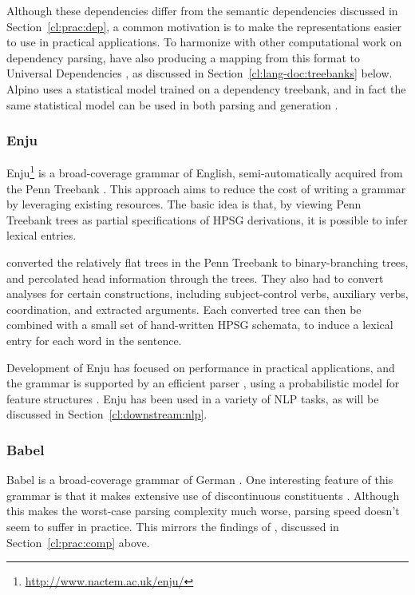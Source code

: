 \documentclass[output=paper,nonflat]{langsci/langscibook}
\begin{document}
Although these dependencies differ from the semantic dependencies discussed in Section~\ref{cl:prac:dep},
a common motivation is to make the representations easier to use in practical applications.
To harmonize with other computational work on dependency parsing,
\citet{Bou:Van:17} have also producing a mapping from this format
to Universal Dependencies \citep[UD;][]{Niv:Mar:Gin:16},
as discussed in Section~\ref{cl:lang-doc:treebanks} below.
Alpino uses a statistical model trained on a dependency treebank,
and in fact the same statistical model can be used in both parsing and generation \citep{dekok2011reversible}.


\subsubsection{Enju}
\label{cl:other:enju}

Enju\footnote{%
	\url{http://www.nactem.ac.uk/enju/}
}
is a broad-coverage grammar of English,
semi-automatically acquired from the Penn Treebank \citep{MNT2005a-u}.
This approach aims to reduce the cost of writing a grammar
by leveraging existing resources.
The basic idea is that, by viewing Penn Treebank trees as partial specifications of HPSG derivations,
it is possible to infer lexical entries.

\citeauthor{MNT2005a-u} converted the relatively flat trees in the Penn Treebank to binary-branching trees,
and percolated head information through the trees.
They also had to convert analyses for certain constructions,
including subject-control verbs, auxiliary verbs, coordination, and extracted arguments.
Each converted tree can then be combined with a small set of hand-written HPSG schemata,
to induce a lexical entry for each word in the sentence.

Development of Enju has focused on performance in practical applications,
and the grammar is supported by an efficient parser \citep{tsuruoka2004enju,matsuzaki2007supertag},
using a probabilistic model for feature structures \citep{MT2008a-u}.
Enju has been used in a variety of NLP tasks, as will be discussed in Section~\ref{cl:downstream:nlp}.


\subsubsection{Babel}
\label{cl:other:babel}

Babel is a broad-coverage grammar of German \citep{Babel,Mueller99a}.
One interesting feature of this grammar is that
it makes extensive use of discontinuous constituents \citep{Mueller2004b}.
Although this makes the worst-case parsing complexity much worse,
parsing speed doesn't seem to suffer in practice.
This mirrors the findings of \citet{Carroll94},
discussed in Section~\ref{cl:prac:comp} above.
\end{document}

